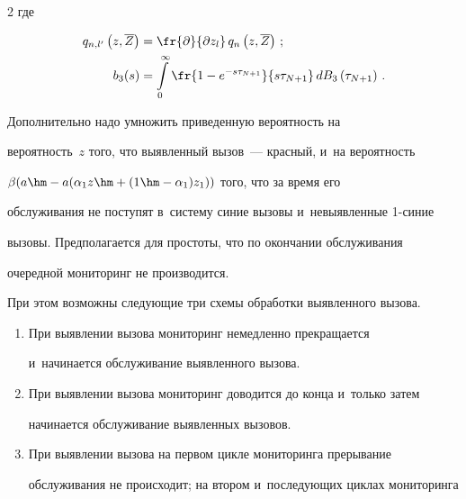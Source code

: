 \begin{multicols}{2}
где 





\noindent


\begin{align*}


q_{n,l^\prime} \left(z,\overline{Z}\right)&= \fr{\partial}{\partial z_l}\,


q_n\left(z,\overline{Z}\right)\,;


\\


b_3(s)&= \int\limits_0^\infty \fr{1-e^{-s\tau_{N+1}}}{s\tau_{N+1}}\,dB_3 


\left(\tau_{N+1}\right)\,.


\end{align*}


  


  Дополнительно надо умножить приведенную вероятность на 


вероятность~$z$ того, что выявленный вызов~--- красный, и~на вероятность 


$\beta(a\hm- a(\alpha_1z\hm+ (1\hm- \alpha_1)z_1))$ того, что за время его 


обслуживания не поступят в~систему синие вызовы и~невыявленные 1-си\-ние 


вызовы. Предполагается для простоты, что по окончании обслуживания 


очередной мониторинг не производится.


  


  При этом возможны следующие три схемы обработки выявленного вызова.


  \begin{enumerate}[1.]


  \item При выявлении вызова мониторинг немедленно прекращается 


и~начинается обслуживание выявленного вызова.


  \item При выявлении вызова мониторинг доводится до конца и~только затем 


начинается обслуживание выявленных вызовов.


  \item При выявлении вызова на первом цикле мониторинга прерывание 


обслуживания не происходит; на втором и~последующих циклах мониторинга 



\end{enumerate}
\end{multicols}
